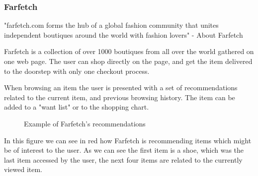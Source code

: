 \subsubsection{Farfetch} %
\label{par:farfetch}

"farfetch.com forms the hub of a global fashion community that unites
independent boutiques around the world with fashion lovers" - About
Farfetch~\cite{Farfetch}

Farfetch is a collection of over 1000 boutiques from all over the world
gathered on one web page.  The user can shop directly on the page, and get the
item delivered to the doorstep with only one checkout process.

When browsing an item the user is presented with a set of recommendations
related to the current item, and previous browsing history.  The item can be
added to a "want list" or to the shopping chart.

\begin{figure}[H]
    \centering
    \caption{Example of Farfetch's recommendations}
    \label{figure:farfetchedRecommendationExample}
\end{figure}

In this figure we can see in red how Farfetch is recommending items which might
be of interest to the user. As we can see the first item is a shoe, which was
the last item accessed by the user, the next four items are related to the
currently viewed item.

